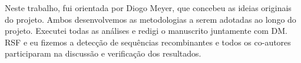 Neste trabalho, fui orientada por Diogo Meyer, que concebeu as ideias originais do projeto. Ambos desenvolvemos as metodologias a serem adotadas ao longo do projeto. Executei todas as análises e redigi o manuscrito juntamente com DM. RSF e eu fizemos a detecção de sequências recombinantes e todos os co-autores participaram na discussão e verificação dos resultados.


 



            

